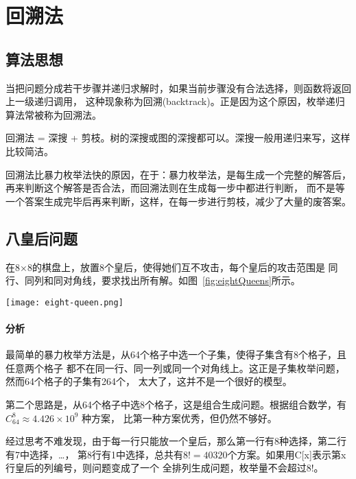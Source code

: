 \chapter{回溯法}

\section{算法思想} %

当把问题分成若干步骤并递归求解时，如果当前步骤没有合法选择，则函数将返回上一级递归调用，
这种现象称为回溯(backtrack)。正是因为这个原因，枚举递归算法常被称为回溯法。

回溯法 = 深搜 + 剪枝。树的深搜或图的深搜都可以。深搜一般用递归来写，这样比较简洁。

回溯法比暴力枚举法快的原因，在于：暴力枚举法，是每生成一个完整的解答后，
再来判断这个解答是否合法，而回溯法则在生成每一步中都进行判断，
而不是等一个答案生成完毕后再来判断，这样，在每一步进行剪枝，减少了大量的废答案。

\section{八皇后问题} %

在8×8的棋盘上，放置8个皇后，使得她们互不攻击，每个皇后的攻击范围是
同行、同列和同对角线，要求找出所有解。如图~\ref{fig:eightQueens}所示。

\begin{center}
\texttt{[image: eight-queen.png]} \\
\label{fig:eightQueens}
\end{center}

\subsubsection{分析}
最简单的暴力枚举方法是，从64个格子中选一个子集，使得子集含有8个格子，且任意两个格子
都不在同一行、同一列或同一个对角线上。这正是子集枚举问题，然而64个格子的子集有264个，
太大了，这并不是一个很好的模型。

第二个思路是，从64个格子中选8个格子，这是组合生成问题。根据组合数学，有 $C_{64}^{8} \approx 4.426 \times 10^9$ 种方案，
比第一种方案优秀，但仍然不够好。

经过思考不难发现，由于每一行只能放一个皇后，那么第一行有8种选择，第二行有7中选择，…，
第8行有1中选择，总共有$8!=40320$个方案。如果用C[x]表示第x行皇后的列编号，则问题变成了一个
全排列生成问题，枚举量不会超过8!。

